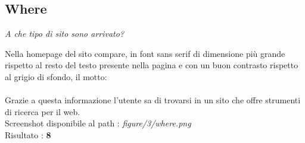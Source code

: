 \subsection{Where}
\begin{center}

\textit{A che tipo di sito sono arrivato?}

\end{center}
\begin{flushleft}
Nella homepage del sito compare, in font sans serif di dimensione
più grande rispetto al resto del testo presente nella pagina e con un buon
contrasto rispetto al grigio di sfondo, il motto: \\
 \\
Grazie a questa informazione l'utente sa di trovarsi in un sito che offre
strumenti di ricerca per il web. \\
Screenshot disponibile al path : \textit{figure/3/where.png} \\
Risultato : \textbf{8}
\end{flushleft}